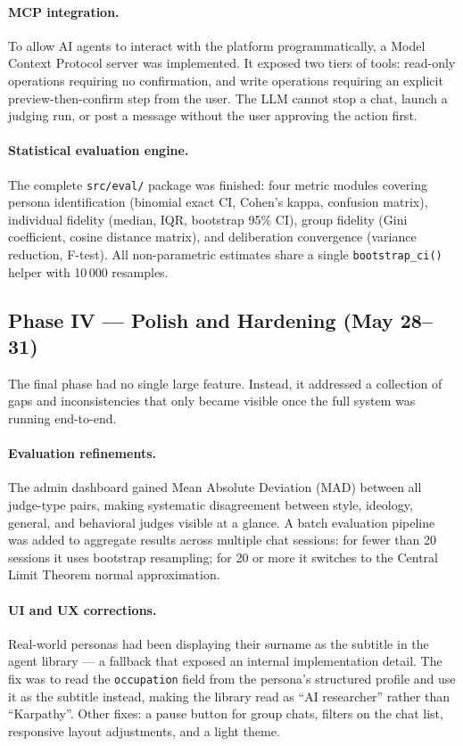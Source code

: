 \documentclass[12pt,a4paper]{article}
\begin{document}
\paragraph{MCP integration.}
To allow AI agents to interact with the platform programmatically, a Model Context Protocol
server was implemented. It exposed two tiers of tools: read-only operations requiring no
confirmation, and write operations requiring an explicit preview-then-confirm step from the
user. The LLM cannot stop a chat, launch a judging run, or post a message without the user
approving the action first.

\paragraph{Statistical evaluation engine.}
The complete \texttt{src/eval/} package was finished: four metric modules covering persona
identification (binomial exact CI, Cohen's kappa, confusion matrix), individual fidelity
(median, IQR, bootstrap 95\% CI), group fidelity (Gini coefficient, cosine distance matrix),
and deliberation convergence (variance reduction, F-test). All non-parametric estimates share
a single \texttt{bootstrap\_ci()} helper with 10\,000 resamples.

\subsection{Phase IV --- Polish and Hardening (May 28--31)}

The final phase had no single large feature. Instead, it addressed a collection of gaps and
inconsistencies that only became visible once the full system was running end-to-end.

\paragraph{Evaluation refinements.}
The admin dashboard gained Mean Absolute Deviation (MAD) between all judge-type pairs, making
systematic disagreement between style, ideology, general, and behavioral judges visible at a
glance. A batch evaluation pipeline was added to aggregate results across multiple chat
sessions: for fewer than 20 sessions it uses bootstrap resampling; for 20 or more it switches
to the Central Limit Theorem normal approximation.

\paragraph{UI and UX corrections.}
Real-world personas had been displaying their surname as the subtitle in the agent library ---
a fallback that exposed an internal implementation detail. The fix was to read the
\texttt{occupation} field from the persona's structured profile and use it as the subtitle
instead, making the library read as ``AI researcher'' rather than ``Karpathy''. Other fixes:
a pause button for group chats, filters on the chat list, responsive layout adjustments, and
a light theme.
\end{document}
